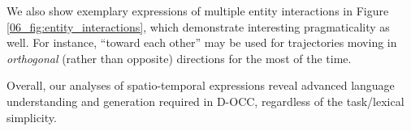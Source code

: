 We also show exemplary expressions of multiple entity interactions in Figure \ref{06_fig:entity_interactions}, which demonstrate interesting pragmaticality as well. For instance, ``toward each other'' may be used for trajectories moving in \textit{orthogonal} (rather than opposite) directions for the most of the time.

Overall, our analyses of spatio-temporal expressions reveal advanced language understanding and generation required in D-OCC, regardless of the task/lexical simplicity.


\begin{table}[t!]
\centering {}
\caption{\label{06_tab:turn_level_statistics}
Turn-level statistics of OCC and D-OCC. \,\cmark\,denotes cases where the previous target stays in common and \,\xmark\,denotes it left at least one agent's view. Note that \# shared entities are 4, 5 or 6 at selection timesteps (Section \ref{06_subsec:sequential_collaborative_reference_task}).
}
\end{table}


